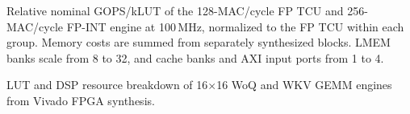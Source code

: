 \caption{Relative nominal GOPS/kLUT of the 128-MAC/cycle FP TCU and 256-MAC/cycle FP-INT engine at 100\,MHz, normalized to the FP TCU within each group. Memory costs are summed from separately synthesized blocks. LMEM banks scale from 8 to 32, and cache banks and AXI input ports from 1 to 4.}

\caption{LUT and DSP resource breakdown of 16$\times$16 WoQ and WKV GEMM engines from Vivado FPGA synthesis.}

